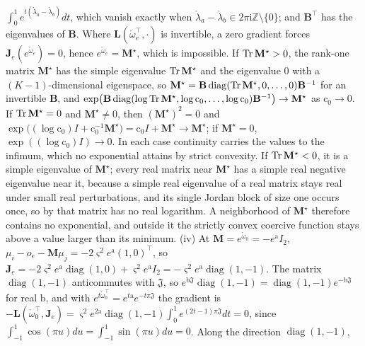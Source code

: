 \(\int_0^1e^{t(\mathring\lambda_a-\mathring\lambda_b)}dt\), which vanish exactly when
\(\mathring\lambda_a-\mathring\lambda_b\in2\pi\mathrm i\mathbb Z\setminus\{0\}\); and \(\mathbf B^\top\) has the
eigenvalues of \(\mathbf B\). Where \(\mathbf L(\mathring\omega_e^\top,\cdot)\) is invertible, a zero gradient
forces \(\mathbf J_e(e^{\mathring\omega_e})=0\), hence \(e^{\mathring\omega_e}=\mathbf M^\star\), which is
impossible. If \(\operatorname{Tr}\mathbf M^\star>0\), the rank-one matrix \(\mathbf M^\star\) has the simple eigenvalue
\(\operatorname{Tr}\mathbf M^\star\) and the eigenvalue \(0\) with a \((K-1)\)-dimensional eigenspace, so
\(\mathbf M^\star=\mathbf B\operatorname{diag}(\operatorname{Tr}\mathbf M^\star,0,\ldots,0)\mathbf B^{-1}\) for an invertible
\(\mathbf B\), and
\(\exp\bigl(\mathbf B\operatorname{diag}(\log\operatorname{Tr}\mathbf M^\star,\log\mathrm c_0,\ldots,\log\mathrm c_0)\mathbf B^{-1}\bigr)\to\mathbf M^\star\)
as \(\mathrm c_0\to0\). If \(\operatorname{Tr}\mathbf M^\star=0\) and \(\mathbf M^\star\neq0\), then \((\mathbf M^\star)^2=0\) and
\(\exp\bigl((\log\mathrm c_0)I+\mathrm c_0^{-1}\mathbf M^\star\bigr)=\mathrm c_0I+\mathbf M^\star\to\mathbf M^\star\); if
\(\mathbf M^\star=0\), \(\exp((\log\mathrm c_0)I)\to0\). In each case continuity carries the values to the
infimum, which no exponential attains by strict convexity. If \(\operatorname{Tr}\mathbf M^\star<0\), it is a simple
eigenvalue of \(\mathbf M^\star\); every real matrix near \(\mathbf M^\star\) has a simple real negative
eigenvalue near it, because a simple real eigenvalue of a real matrix stays real under small real
perturbations, and its single Jordan block of size one occurs once, so by
\citet[Theorem~1]{culver1966existence} that matrix has no real logarithm. A neighborhood of
\(\mathbf M^\star\) therefore contains no exponential, and outside it the strictly convex coercive function
stays above a value larger than its minimum.
(iv) At \(\mathbf M=e^{\mathring\omega_0}=-e^{\mathrm a}I_2\),
\(\mu_i-o_e-\mathbf M\mu_j=-2\varsigma^2e^{\mathrm a}(1,0)^\top\), so
\(\mathbf J_e=-2\varsigma^2e^{\mathrm a}\operatorname{diag}(1,0)+\varsigma^2e^{\mathrm a}I_2
=-\varsigma^2e^{\mathrm a}\operatorname{diag}(1,-1)\). The matrix \(\operatorname{diag}(1,-1)\)
anticommutes with \(\mathfrak J\), so
\(e^{\mathrm b\mathfrak J}\operatorname{diag}(1,-1)=\operatorname{diag}(1,-1)e^{-\mathrm b\mathfrak J}\) for real
\(\mathrm b\), and with \(e^{t\mathring\omega_0^\top}=e^{t\mathrm a}e^{-t\pi\mathfrak J}\) the gradient is
\(-\mathbf L(\mathring\omega_0^\top,\mathbf J_e)=\varsigma^2e^{2\mathrm a}\operatorname{diag}(1,-1)\int_0^1e^{(2t-1)\pi\mathfrak J}dt=0\),
since \(\int_{-1}^1\cos(\pi u)du=\int_{-1}^1\sin(\pi u)du=0\). Along the direction \(\operatorname{diag}(1,-1)\),
